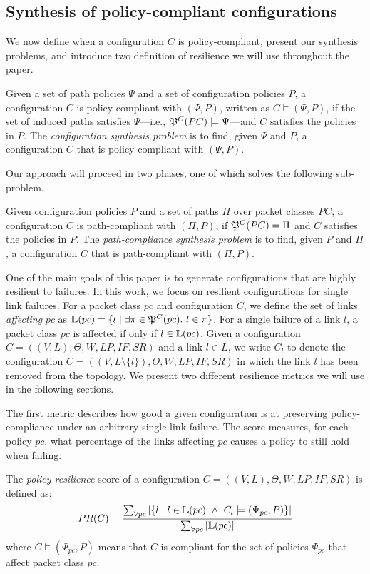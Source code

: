 \subsection{Synthesis of policy-compliant configurations}
We now define when a configuration $C$ is policy-compliant, present our synthesis problems, and introduce two definition of resilience we will use throughout the paper.
\begin{definition} \label{def:policycompliance}
	Given a set of path policies $\Psi$ and a set of configuration policies $P$,
	a configuration $C$ is policy-compliant with $(\Psi,P)$,  
	written as $C \models (\Psi,P)$, if the set of
	induced paths satisfies $\Psi$---i.e., $\mathfrak{P}^C(PC) \models \Psi$---and $C$ satisfies the policies in $P$.
	The \emph{configuration synthesis problem} is to find, given $\Psi$ and $P$,
a configuration $C$ that is policy compliant with $(\Psi,P)$.
\end{definition}

Our approach will proceed in two phases,
one of which solves the following sub-problem.  
\begin{definition} \label{def:pathcompliance}
Given configuration policies $P$
and a set of paths $\Pi$ over packet classes $PC$,
	a configuration $C$ is path-compliant with 
	$(\Pi,P)$,
	if $\mathfrak{P}^C(PC)=\Pi$ and $C$ satisfies the policies in $P$.
	The \emph{path-compliance synthesis problem} is to find, given $P$ and $\Pi$,
a configuration $C$ that is path-compliant with $(\Pi,P)$.
\end{definition}

One of the main goals of this paper is to 
generate configurations that are highly resilient to failures. In this
work, we focus on resilient configurations for single link failures. 
For a packet class $pc$ and configuration $C$, we define 
the set of links \emph{affecting} $pc$ as 
$\mathbb{L}(pc) = \{l \mid \exists \pi \in \mathfrak{P}^C(pc).~l \in \pi  \}$.
For a single failure of a link $l$, a packet class $pc$ is affected 
if only if $l \in \mathbb{L}(pc)$. 
Given a configuration
$C=((V,L), \Theta,W,LP,IF,SR)$ and a link $l\in L$,
we write $C_l$ 
to denote the configuration
$C=((V,L\setminus\{l\}), \Theta,W,LP,IF,SR)$
in which the link $l$ has been removed from the topology.
We present two different resilience metrics 
we will use in the following sections. 

The first metric describes how good a given configuration
is at preserving policy-compliance under an 
arbitrary single link failure. 
The score measures, for each policy $pc$, what percentage of the links affecting $pc$
causes a policy to still hold when failing.
\begin{definition}
The \emph{policy-resilience} score of a configuration 
$C=((V,L), \Theta,W,LP,IF,SR)$
is defined as:
\[
PR(C)=\frac{\sum_{\forall pc} |\{ l \mid l \in \mathbb{L}(pc) ~\wedge~ C_l \models (\Psi_{pc}, P) \}|}
{\sum_{\forall pc} |\mathbb{L}(pc)|}
\]
where $C \models (\Psi_{pc}, P)$ means that $C$ is 
compliant for the set of policies $\Psi_{pc}$ that affect packet class $pc$.
\end{definition}

